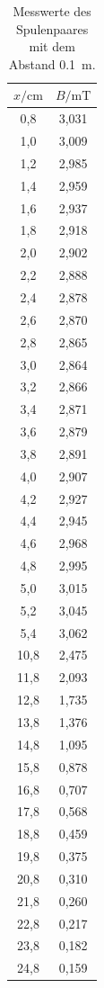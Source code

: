 \begin{table}[H]
  \centering
  \caption{Messwerte des Spulenpaares mit dem Abstand \SI{0.1}{\meter}.}
  \label{tab:4}
  \begin{tabular}{c c}
    \toprule
    $x/\si{\centi\meter}$ & $B/\si{\milli\tesla}$ \\
    \midrule
     0,8 & 3,031 \\
     1,0 & 3,009 \\
     1,2 & 2,985 \\
     1,4 & 2,959 \\
     1,6 & 2,937 \\
     1,8 & 2,918 \\
     2,0 & 2,902 \\
     2,2 & 2,888 \\
     2,4 & 2,878 \\
     2,6 & 2,870 \\
     2,8 & 2,865 \\
     3,0 & 2,864 \\
     3,2 & 2,866 \\
     3,4 & 2,871 \\
     3,6 & 2,879 \\
     3,8 & 2,891 \\
     4,0 & 2,907 \\
     4,2 & 2,927 \\
     4,4 & 2,945 \\
     4,6 & 2,968 \\
     4,8 & 2,995 \\
     5,0 & 3,015 \\
     5,2 & 3,045 \\
     5,4 & 3,062 \\
    10,8 & 2,475 \\
    11,8 & 2,093 \\
    12,8 & 1,735 \\
    13,8 & 1,376 \\
    14,8 & 1,095 \\
    15,8 & 0,878 \\
    16,8 & 0,707 \\
    17,8 & 0,568 \\
    18,8 & 0,459 \\
    19,8 & 0,375 \\
    20,8 & 0,310 \\
    21,8 & 0,260 \\
    22,8 & 0,217 \\
    23,8 & 0,182 \\
    24,8 & 0,159 \\
    \bottomrule
  \end{tabular}
\end{table}

